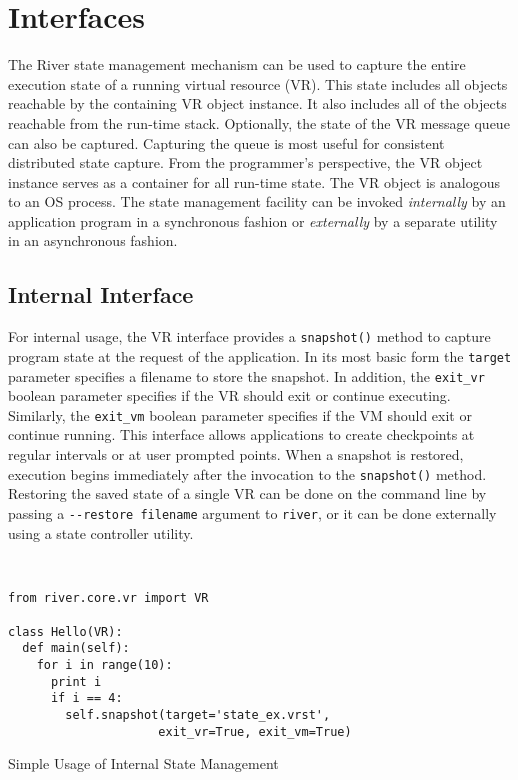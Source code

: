 \section{Interfaces}
\label{sec:Interface}

The River state management mechanism can be used to capture the entire execution
state of a running virtual resource (VR). This state includes all objects
reachable by the containing VR object instance. It also includes all of the
objects reachable from the run-time stack. Optionally, the state of the VR
message queue can also be captured. Capturing the queue is most useful for
consistent distributed state capture. From the programmer's perspective, the VR object
instance serves as a container for all run-time state. The VR object is analogous
to an OS process. The state management facility can be invoked {\it
internally} by an application program in a synchronous fashion or {\it
externally} by a separate utility in an asynchronous fashion.

\subsection{Internal Interface}

For internal usage, the VR interface provides a \verb+snapshot()+ method
to capture program state at the request of the application. In its most
basic form the \verb+target+ parameter specifies a filename to store the
snapshot. In addition, the \verb+exit_vr+ boolean parameter specifies if
the VR should exit or continue executing. Similarly, the \verb+exit_vm+
boolean parameter specifies if the VM should exit or continue running.
This interface allows applications to create checkpoints at regular
intervals or at user prompted points. When a snapshot is restored,
execution begins immediately after the invocation to the
\verb+snapshot()+ method. Restoring the saved state of a single VR can
be done on the command line by passing a \verb+--restore filename+ argument
to \verb+river+, or it can be done externally using a state controller utility.

\begin{listing}
\scriptsize
\begin{verbatim}


from river.core.vr import VR

class Hello(VR):
  def main(self):
    for i in range(10):
      print i
      if i == 4:
        self.snapshot(target='state_ex.vrst',
                     exit_vr=True, exit_vm=True)
\end{verbatim}
\normalsize
\caption{Simple Usage of Internal State Management}
\label{ex:internalstate}
\end{listing}

